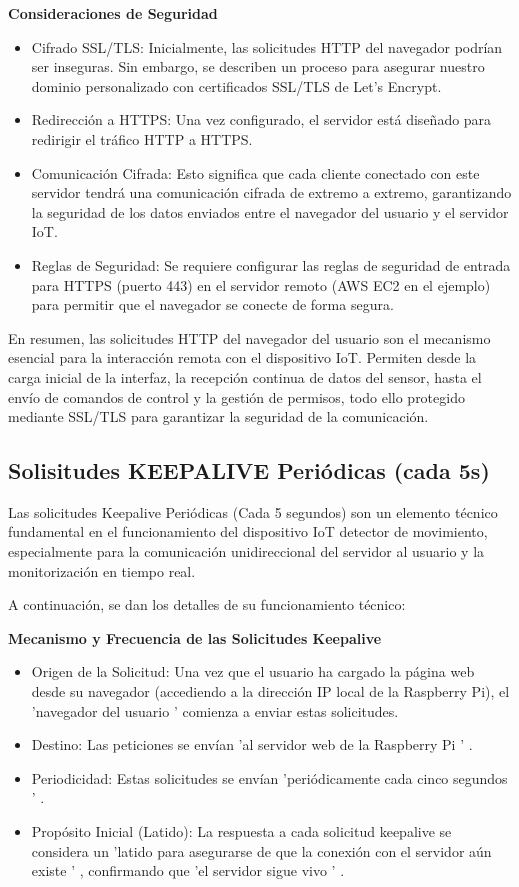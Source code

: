 \documentclass{report}
\begin{document}
\textbf{Consideraciones de Seguridad}
\begin{itemize}
    \item Cifrado SSL/TLS: Inicialmente, las solicitudes HTTP del navegador podrían ser inseguras. Sin embargo, se  describen un proceso para 
    asegurar nuestro dominio personalizado con certificados SSL/TLS de Let's Encrypt.
    \item Redirección a HTTPS: Una vez configurado, el servidor está diseñado para redirigir el tráfico HTTP a HTTPS.
    \item Comunicación Cifrada: Esto significa que cada cliente conectado con este servidor tendrá una comunicación cifrada de extremo a extremo, 
    garantizando la seguridad de los datos enviados entre el navegador del usuario y el servidor IoT.
    \item Reglas de Seguridad: Se requiere configurar las reglas de seguridad de entrada para HTTPS (puerto 443) en el servidor remoto 
    (AWS EC2 en el ejemplo) para permitir que el navegador se conecte de forma segura.
\end{itemize}

En resumen, las solicitudes HTTP del navegador del usuario son el mecanismo esencial para la interacción remota con el dispositivo IoT. 
Permiten desde la carga inicial de la interfaz, la recepción continua de datos del sensor, hasta el envío de comandos de control y la gestión 
de permisos, todo ello protegido mediante SSL/TLS para garantizar la seguridad de la comunicación.

\subsection{Solisitudes KEEPALIVE Periódicas (cada 5s)}
Las solicitudes Keepalive Periódicas (Cada 5 segundos) son un elemento técnico fundamental en el funcionamiento del dispositivo IoT detector de movimiento, 
especialmente para la comunicación unidireccional del servidor al usuario y la monitorización en tiempo real.

A continuación, se dan los detalles de su funcionamiento técnico:

\textbf{Mecanismo y Frecuencia de las Solicitudes Keepalive}
\begin{itemize}
    \item Origen de la Solicitud:  Una vez que el usuario ha cargado la página web desde su navegador (accediendo a la dirección IP local de la Raspberry Pi), 
    el 'navegador del usuario '  comienza a enviar estas solicitudes.
    \item Destino:  Las peticiones se envían   'al servidor web de la Raspberry Pi ' .
    \item Periodicidad:  Estas solicitudes se envían   'periódicamente cada cinco segundos ' .
    \item Propósito Inicial (Latido):  La respuesta a cada solicitud keepalive se considera un   'latido para asegurarse de que la conexión con el servidor 
    aún existe ' , confirmando que   'el servidor sigue vivo ' .
\end{itemize}
\end{document}
